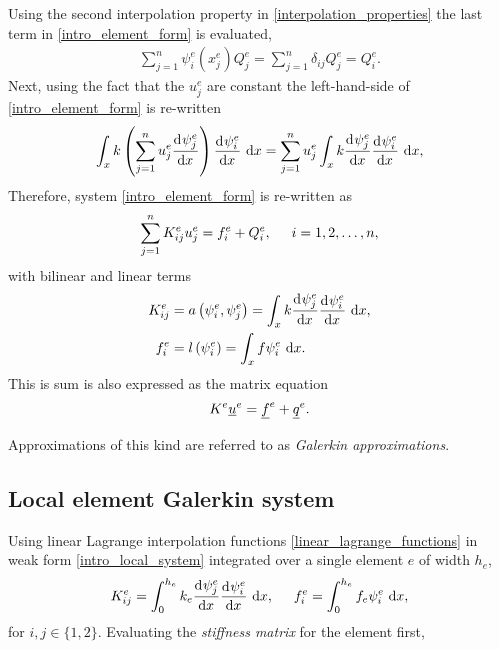 Using the second interpolation property in \cref{interpolation_properties} the last term in \cref{intro_element_form} is evaluated,
\begin{align*}
  \sum_{j=1}^n \psi_i^e(x_j^e) Q_j^e = \sum_{j=1}^n \delta_{ij} Q_j^e = Q_i^e.
\end{align*}
Next, using the fact that the $u_j^e$ are constant the left-hand-side of \cref{intro_element_form} is re-written
\begin{align*}
  \int_x k \left( \sum_{j=1}^n u_j^e \frac{\mathrm{d}{^{}} \psi_j^e}{\mathrm{d} x{^{}} } \right) \frac{\mathrm{d}{^{}} \psi_i^e}{\mathrm{d} x{^{}} } \ \mathrm{d}x =  \sum_{j=1}^n u_j^e \int_x k \frac{\mathrm{d}{^{}} \psi_j^e}{\mathrm{d} x{^{}} } \frac{\mathrm{d}{^{}} \psi_i^e}{\mathrm{d} x{^{}} } \ \mathrm{d}x, 
\end{align*}
Therefore, system \cref{intro_element_form} is re-written as
\begin{align*}
  \sum_{j=1}^n K_{ij}^e u_j^e = f_i^e + Q_i^e, \hspace{5mm} i = 1,2,\ldots,n,
\end{align*}
with bilinear and linear terms
\begin{align*}
  K_{ij}^e &= a\left( \psi_i^e, \psi_j^e \right) = \int_x k \frac{\mathrm{d}{^{}} \psi_j^e}{\mathrm{d} x{^{}} } \frac{\mathrm{d}{^{}} \psi_i^e}{\mathrm{d} x{^{}} } \ \mathrm{d}x, \\
  f_i^e &= l\left( \psi_i^e \right) = \int_x f \psi_i^e \ \mathrm{d}x.
\end{align*}
This is sum is also expressed as the matrix equation
\begin{align}
  \label{intro_local_system}
  K^e \underline{u}^e = \underline{f}^e + \underline{q}^e.
\end{align}

Approximations of this kind are referred to as \emph{Galerkin approximations}.

\subsection{Local element Galerkin system} \label{ssn_local_galerkin_assembly}

Using linear Lagrange interpolation functions \cref{linear_lagrange_functions} in weak form \cref{intro_local_system} integrated over a single element $e$ of width $h_e$,
\begin{align*}
  K_{ij}^e = \int_0^{h_e} k_e \frac{\mathrm{d}{^{}} \psi_j^e}{\mathrm{d} x{^{}} } \frac{\mathrm{d}{^{}} \psi_i^e}{\mathrm{d} x{^{}} } \ \mathrm{d}x, \hspace{5mm} f_i^e = \int_0^{h_e} f_e \psi_i^e \ \mathrm{d}x,
\end{align*}
for $i,j \in \{1,2\}$.
Evaluating the  \emph{stiffness matrix} for the element first,

